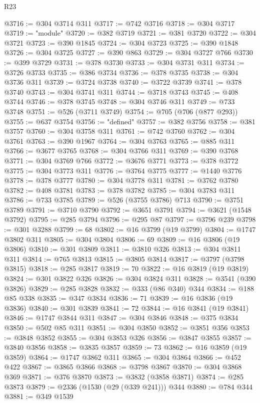 \begin{lexlean}{R23}
\begin{coremodule}
@3716 := @304 @3714 @311
@3717 := @742 @3716
@3718 := @304 @3717
@3719 := "module"
@3720 := @382 @3719
@3721 := @381 @3720
@3722 := @304 @3721
@3723 := @390 @1845
@3724 := @304 @3723
@3725 := @390 @1848
@3726 := @304 @3725
@3727 := @390 @863
@3729 := @304 @3727 @766
@3730 := @399 @3729
@3731 := @378 @3730
@3733 := @304 @3731 @311
@3734 := @3726 @3733
@3735 := @386 @3734
@3736 := @378 @3735
@3738 := @304 @3736 @311
@3739 := @3724 @3738
@3740 := @3722 @3739
@3741 := @378 @3740
@3743 := @304 @3741 @311
@3744 := @3718 @3743
@3745 := @408 @3744
@3746 := @378 @3745
@3748 := @304 @3746 @311
@3749 := @733 @3748
@3751 := @526 (@3711 @3749)
@3754 := @705 (@706 (@877 @293))
@3755 := @637 @3754
@3756 := "defined"
@3757 := @382 @3756
@3758 := @381 @3757
@3760 := @304 @3758 @311
@3761 := @742 @3760
@3762 := @304 @3761
@3763 := @390 @1967
@3764 := @304 @3763
@3765 := @885 @311
@3766 := @3677 @3765
@3768 := @304 @3766 @311
@3769 := @390 @3768
@3771 := @304 @3769 @766
@3772 := @3676 @3771
@3773 := @378 @3772
@3775 := @304 @3773 @311
@3776 := @3764 @3775
@3777 := @1440 @3776
@3778 := @378 @3777
@3780 := @304 @3778 @311
@3781 := @3762 @3780
@3782 := @408 @3781
@3783 := @378 @3782
@3785 := @304 @3783 @311
@3786 := @733 @3785
@3789 := @526 (@3755 @3786) @713
@3790 := @3751 @3789
@3791 := @3710 @3790
@3792 := @3651 @3791
@3794 := @3621 (@1548 @3792)
@3795 := @285 @3794
@3796 := @295 @87
@3797 := @3796 @239
@3798 := @301 @3288
@3799 := 68
@3802 := @16 @3799 (@19 @3799)
@3804 := @1747 @3802 @311
@3805 := @304 @3804
@3806 := 69
@3809 := @16 @3806 (@19 @3806)
@3810 := @301 @3809
@3811 := @3810 @326
@3813 := @304 @3811 @311
@3814 := @765 @3813
@3815 := @3805 @3814
@3817 := @3797 (@3798 @3815)
@3818 := @285 @3817
@3819 := 70
@3822 := @16 @3819 (@19 @3819)
@3824 := @301 @3822 @326
@3826 := @304 @3824 @311
@3828 := @3541 (@390 @3826)
@3829 := @285 @3828
@3832 := @333 (@86 @340) @344
@3834 := @188 @85 @338
@3835 := @347 @3834
@3836 := 71
@3839 := @16 @3836 (@19 @3836)
@3840 := @301 @3839
@3841 := 72
@3844 := @16 @3841 (@19 @3841)
@3846 := @1747 @3844 @311
@3847 := @304 @3846
@3848 := @375 @3834
@3850 := @502 @85 @311
@3851 := @304 @3850
@3852 := @3851 @356
@3853 := @3848 @3852
@3855 := @304 @3853 @326
@3856 := @3847 @3855
@3857 := @3840 @3856
@3858 := @3835 @3857
@3859 := 73
@3862 := @16 @3859 (@19 @3859)
@3864 := @1747 @3862 @311
@3865 := @304 @3864
@3866 := @452 @422
@3867 := @3865 @3866
@3868 := @3798 @3867
@3870 := @304 @3868 @369
@3871 := @376 @3870
@3873 := @3832 (@3858 @3871)
@3874 := @285 @3873
@3879 := @2336 (@1530 (@29 (@339 @241))) @344
@3880 := @784 @344
@3881 := @349 @1539

\end{coremodule}
\end{lexlean}
